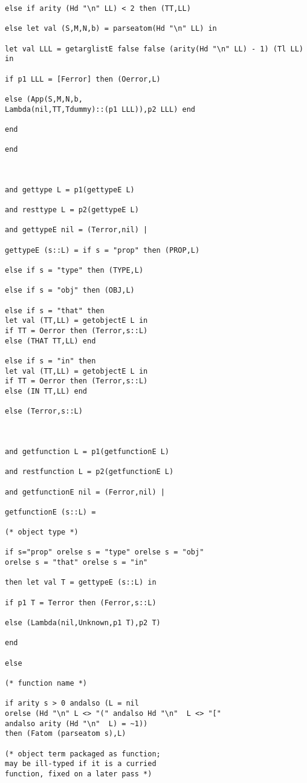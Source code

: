 \documentclass[12pt]{article}
\begin{document}
\begin{verbatim}
else if arity (Hd "\n" LL) < 2 then (TT,LL)

else let val (S,M,N,b) = parseatom(Hd "\n" LL) in

let val LLL = getarglistE false false (arity(Hd "\n" LL) - 1) (Tl LL) in 

if p1 LLL = [Ferror] then (Oerror,L)

else (App(S,M,N,b,
Lambda(nil,TT,Tdummy)::(p1 LLL)),p2 LLL) end

end 

end 



and gettype L = p1(gettypeE L)

and resttype L = p2(gettypeE L)

and gettypeE nil = (Terror,nil) |

gettypeE (s::L) = if s = "prop" then (PROP,L)

else if s = "type" then (TYPE,L)

else if s = "obj" then (OBJ,L)

else if s = "that" then
let val (TT,LL) = getobjectE L in
if TT = Oerror then (Terror,s::L)
else (THAT TT,LL) end

else if s = "in" then
let val (TT,LL) = getobjectE L in
if TT = Oerror then (Terror,s::L)
else (IN TT,LL) end

else (Terror,s::L)



and getfunction L = p1(getfunctionE L)

and restfunction L = p2(getfunctionE L)

and getfunctionE nil = (Ferror,nil) |

getfunctionE (s::L) =

(* object type *)

if s="prop" orelse s = "type" orelse s = "obj"
orelse s = "that" orelse s = "in"

then let val T = gettypeE (s::L) in

if p1 T = Terror then (Ferror,s::L)

else (Lambda(nil,Unknown,p1 T),p2 T)

end

else

(* function name *)

if arity s > 0 andalso (L = nil 
orelse (Hd "\n" L <> "(" andalso Hd "\n"  L <> "["
andalso arity (Hd "\n"  L) = ~1))
then (Fatom (parseatom s),L)

(* object term packaged as function;
may be ill-typed if it is a curried
function, fixed on a later pass *)


\end{verbatim}
\end{document}
